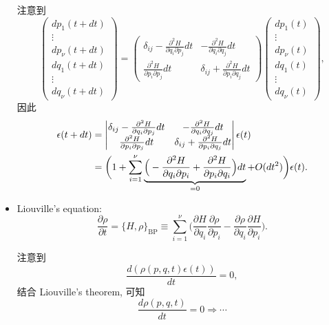 \begin{itemize}
	\begin{tcolorbox}[title=proof:]
		注意到
		\begin{equation}
			\begin{pmatrix}
				dp_1(t + dt) \\
				\vdots \\
				dp_\nu(t + dt) \\
				dq_1(t + dt) \\
				\vdots \\
				dq_\nu(t + dt)
			\end{pmatrix} = \begin{pmatrix}
				\delta_{i j} - \frac{\partial^2 H}{\partial q_i \partial p_j} dt & - \frac{\partial^2 H}{\partial q_i \partial q_j} dt \\
				\frac{\partial^2 H}{\partial p_i \partial p_j} dt & \delta_{i j} + \frac{\partial^2 H}{\partial p_i \partial q_j} dt
			\end{pmatrix} \begin{pmatrix}
				dp_1(t) \\
				\vdots \\
				dp_\nu(t) \\
				dq_1(t) \\
				\vdots \\
				dq_\nu(t)
			\end{pmatrix},
		\end{equation}
		因此
		\begin{align}
			\epsilon(t + dt) &= \begin{vmatrix}
				\delta_{i j} - \frac{\partial^2 H}{\partial q_i \partial p_j} dt & - \frac{\partial^2 H}{\partial q_i \partial q_j} dt \\
				\frac{\partial^2 H}{\partial p_i \partial p_j} dt & \delta_{i j} + \frac{\partial^2 H}{\partial p_i \partial q_j} dt
			\end{vmatrix} \epsilon(t) \notag \\
			&= \bigg( 1 + \sum_{i = 1}^\nu \underbrace{\Big( - \frac{\partial^2 H}{\partial q_i \partial p_i} + \frac{\partial^2 H}{\partial p_i \partial q_i} \Big) dt}_{= 0} + O(dt^2) \bigg) \epsilon(t).
		\end{align}
	\end{tcolorbox}
	
	\item Liouville's equation:
	\begin{equation}
		\frac{\partial \rho}{\partial t} = \{H, \rho\}_\text{BP} \equiv \sum_{i = 1}^\nu \Big( \frac{\partial H}{\partial q_i} \frac{\partial \rho}{\partial p_i} - \frac{\partial \rho}{\partial q_i} \frac{\partial H}{\partial p_i} \Big).
	\end{equation}
	
	\begin{tcolorbox}[title=proof:]
		注意到
		\begin{equation}
			\frac{d(\rho(p, q, t) \epsilon(t))}{dt} = 0,
		\end{equation}
		结合 Liouville's theorem, 可知
		\begin{equation}
			\frac{d\rho(p, q, t)}{dt} = 0 \Longrightarrow \cdots
		\end{equation}
	\end{tcolorbox}
\end{itemize}
